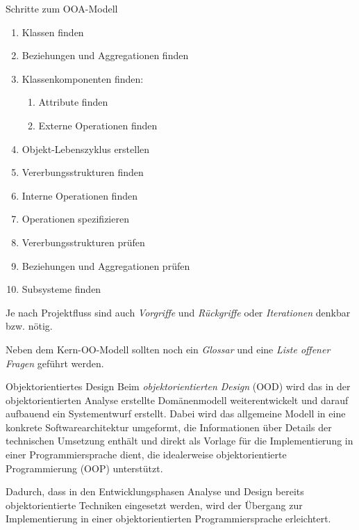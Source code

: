 \begin{defi}{Schritte zum OOA-Modell}
    \begin{enumerate}
        \item Klassen finden
        \item Beziehungen und Aggregationen finden
        \item Klassenkomponenten finden:
              \begin{enumerate}
                  \item Attribute finden
                  \item Externe Operationen finden
              \end{enumerate}
        \item Objekt-Lebenszyklus erstellen
        \item Vererbungsstrukturen finden
        \item Interne Operationen finden
        \item Operationen spezifizieren
        \item Vererbungsstrukturen prüfen
        \item Beziehungen und Aggregationen prüfen
        \item Subsysteme finden
    \end{enumerate}

    Je nach Projektfluss sind auch \emph{Vorgriffe} und \emph{Rückgriffe} oder \emph{Iterationen} denkbar bzw. nötig.

    Neben dem Kern-OO-Modell sollten noch ein \emph{Glossar} und eine \emph{Liste offener Fragen} geführt werden.
\end{defi}

\begin{defi}{Objektorientiertes Design}
    Beim \emph{objektorientierten Design} (OOD) wird das in der objektorientierten Analyse erstellte Domänenmodell weiterentwickelt und darauf aufbauend ein Systementwurf erstellt.
    Dabei wird das allgemeine Modell in eine konkrete Softwarearchitektur umgeformt, die Informationen über Details der technischen Umsetzung enthält und direkt als Vorlage für die Implementierung in einer Programmiersprache dient, die idealerweise objektorientierte Programmierung (OOP) unterstützt.

    Dadurch, dass in den Entwicklungsphasen Analyse und Design bereits objektorientierte Techniken eingesetzt werden, wird der Übergang zur Implementierung in einer objektorientierten Programmiersprache erleichtert.
\end{defi}